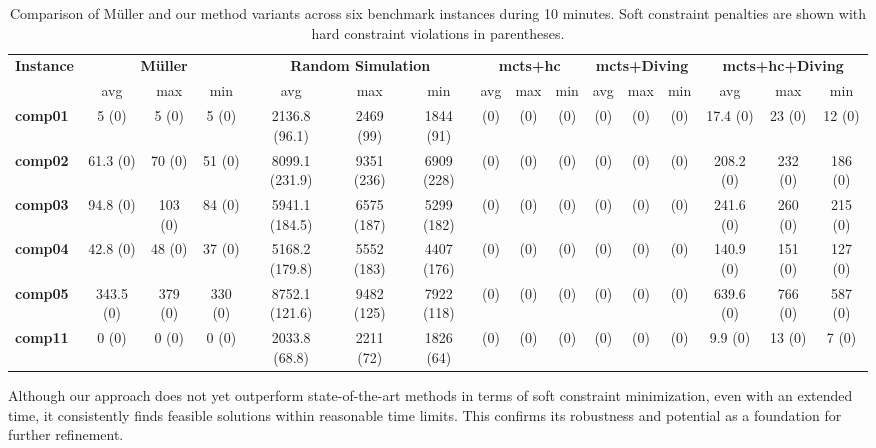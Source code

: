 \begin{landscape}
\begin{table}[p]
\centering
\setlength{\tabcolsep}{3pt}
\begin{tabular}{lccc|ccc|ccc|ccc|ccc}
\hline
\textbf{Instance}
& \multicolumn{3}{c|}{\textbf{Müller}} 
& \multicolumn{3}{c|}{\textbf{Random Simulation}} 
& \multicolumn{3}{c|}{\textbf{\ac{mcts}+\ac{hc}}} 
& \multicolumn{3}{c|}{\textbf{\ac{mcts}+Diving}} 
& \multicolumn{3}{c}{\textbf{\ac{mcts}+\ac{hc}+Diving}} \\
& avg & max & min 
& avg & max & min 
& avg & max & min 
& avg & max & min 
& avg & max & min \\
\hline
\textbf{comp01} & 5 (0) & 5 (0) & 5 (0) & 2136.8 (96.1) & 2469 (99) & 1844 (91) & (0) & (0) & (0) & (0) & (0) & (0) & 17.4 (0) & 23 (0) & 12 (0) \\
\textbf{comp02} & 61.3 (0) & 70 (0) & 51 (0) & 8099.1 (231.9) & 9351 (236) & 6909 (228) & (0) & (0) & (0) & (0) & (0) & (0) & 208.2 (0) & 232 (0) & 186 (0) \\
\textbf{comp03} & 94.8 (0) & 103 (0) & 84 (0) & 5941.1 (184.5) & 6575 (187) & 5299 (182) & (0) & (0) & (0) & (0) & (0) & (0) & 241.6 (0) & 260 (0) & 215 (0) \\
\textbf{comp04} & 42.8 (0) & 48 (0) & 37 (0) & 5168.2 (179.8) & 5552 (183) & 4407 (176) & (0) & (0) & (0) & (0) & (0) & (0) & 140.9 (0) & 151 (0) & 127 (0) \\
\textbf{comp05} & 343.5 (0) & 379 (0) & 330 (0) & 8752.1 (121.6) & 9482 (125) & 7922 (118) & (0) & (0) & (0) & (0) & (0) & (0) & 639.6 (0) & 766 (0) & 587 (0) \\
\textbf{comp11} & 0 (0) & 0 (0) & 0 (0) & 2033.8 (68.8) & 2211 (72) & 1826 (64) & (0) & (0) & (0) & (0) & (0) & (0) & 9.9 (0) & 13 (0) & 7 (0) \\
\hline
\end{tabular}
\caption{Comparison of Müller and our method variants across six benchmark instances during 10 minutes. Soft constraint penalties are shown with hard constraint violations in parentheses.}
\label{tab:comparison_results}
\end{table}
\end{landscape}


Although our approach does not yet outperform state-of-the-art methods in terms of soft constraint minimization, even with an extended time, it consistently finds feasible solutions within reasonable time limits. This confirms its robustness and potential as a foundation for further refinement.

